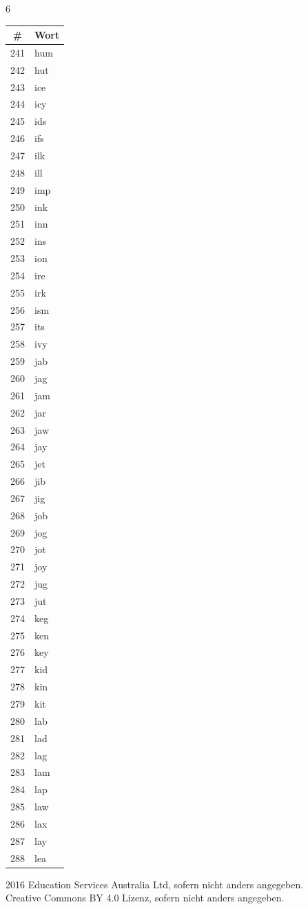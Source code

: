 \documentclass[11pt,a4paper]{article}
\begin{document}
\begin{multicols}{6}
\columnbreak

\begin{tabular}{cl}
\toprule
\# & Wort \\
\midrule
241 & hum \\
242 & hut \\
243 & ice \\
244 & icy \\
245 & ids \\
246 & ifs \\
247 & ilk \\
248 & ill \\
249 & imp \\
250 & ink \\
251 & inn \\
252 & ins \\
253 & ion \\
254 & ire \\
255 & irk \\
256 & ism \\
257 & its \\
258 & ivy \\
259 & jab \\
260 & jag \\
261 & jam \\
262 & jar \\
263 & jaw \\
264 & jay \\
265 & jet \\
266 & jib \\
267 & jig \\
268 & job \\
269 & jog \\
270 & jot \\
271 & joy \\
272 & jug \\
273 & jut \\
274 & keg \\
275 & ken \\
276 & key \\
277 & kid \\
278 & kin \\
279 & kit \\
280 & lab \\
281 & lad \\
282 & lag \\
283 & lam \\
284 & lap \\
285 & law \\
286 & lax \\
287 & lay \\
288 & lea \\
\bottomrule
\end{tabular}
\end{multicols}

\vfill

\noindent\small
\textcopyright{} 2016 Education Services Australia Ltd, sofern nicht anders angegeben.\\
Creative Commons BY 4.0 Lizenz, sofern nicht anders angegeben.
\end{document}
